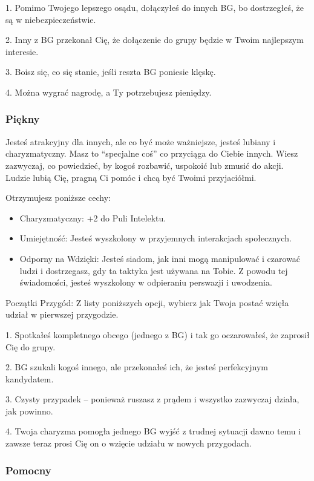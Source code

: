 1. Pomimo Twojego lepszego osądu, dołączyłeś do innych BG, bo dostrzegłeś, że są w niebezpieczeństwie.  

2. Inny z BG przekonał Cię, że dołączenie do grupy będzie w Twoim najlepszym interesie.

3. Boisz się, co się stanie, jeśli reszta BG poniesie klęskę.

4. Można wygrać nagrodę, a Ty potrzebujesz pieniędzy.

\subsubsection{Piękny}

Jesteś atrakcyjny dla innych, ale co być może ważniejsze, jesteś lubiany i charyzmatyczny. Masz to “specjalne coś” co przyciąga do Ciebie innych. Wiesz zazwyczaj, co powiedzieć, by kogoś rozbawić, uspokoić lub zmusić do akcji. Ludzie lubią Cię, pragną Ci pomóc i chcą być Twoimi przyjaciółmi. 

Otrzymujesz poniższe cechy:
\begin{itemize}
    \item Charyzmatyczny: +2 do Puli Intelektu.
    \item Umiejętność: Jesteś wyszkolony w przyjemnych interakcjach społecznych.
    \item Odporny na Wdzięki: Jesteś siadom, jak inni mogą manipulować i czarować ludzi i dostrzegasz, gdy ta taktyka jest używana na Tobie. Z powodu tej świadomości, jesteś wyszkolony w odpieraniu perswazji i uwodzenia.
\end{itemize}

Początki Przygód: Z listy poniższych opcji, wybierz jak Twoja postać wzięła udział w pierwszej przygodzie.

1. Spotkałeś kompletnego obcego (jednego z BG) i tak go oczarowałeś, że zaprosił Cię do grupy.

2. BG szukali kogoś innego, ale przekonałeś ich, że jesteś perfekcyjnym kandydatem.

3. Czysty przypadek – ponieważ ruszasz z prądem i wszystko zazwyczaj działa, jak powinno.

4. Twoja charyzma pomogła jednego BG wyjść z trudnej sytuacji dawno temu i zawsze teraz prosi Cię on o wzięcie udziału w nowych przygodach.

\subsubsection{Pomocny}

